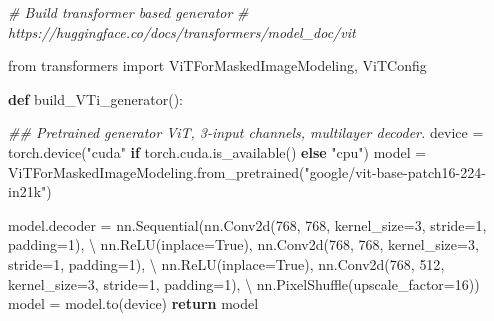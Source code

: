\documentclass[
]{article}
\newenvironment{Shaded}{}{}
\newcommand{\CommentTok}[1]{\textcolor[rgb]{0.38,0.63,0.69}{\textit{#1}}}
\newcommand{\ControlFlowTok}[1]{\textcolor[rgb]{0.00,0.44,0.13}{\textbf{#1}}}
\newcommand{\DecValTok}[1]{\textcolor[rgb]{0.25,0.63,0.44}{#1}}
\newcommand{\ImportTok}[1]{#1}
\newcommand{\KeywordTok}[1]{\textcolor[rgb]{0.00,0.44,0.13}{\textbf{#1}}}
\newcommand{\NormalTok}[1]{#1}
\newcommand{\OperatorTok}[1]{\textcolor[rgb]{0.40,0.40,0.40}{#1}}
\newcommand{\StringTok}[1]{\textcolor[rgb]{0.25,0.44,0.63}{#1}}
\newcommand{\VariableTok}[1]{\textcolor[rgb]{0.10,0.09,0.49}{#1}}
\begin{document}
\begin{Shaded}
\begin{Highlighting}[]
\CommentTok{\# Build transformer based generator}
\CommentTok{\# https://huggingface.co/docs/transformers/model\_doc/vit}

\ImportTok{from}\NormalTok{ transformers }\ImportTok{import}\NormalTok{ ViTForMaskedImageModeling, ViTConfig}


\KeywordTok{def}\NormalTok{ build\_VTi\_generator():}

    \CommentTok{\#\# Pretrained generator ViT, 3{-}input channels, multilayer decoder.}
\NormalTok{    device }\OperatorTok{=}\NormalTok{ torch.device(}\StringTok{"cuda"} \ControlFlowTok{if}\NormalTok{ torch.cuda.is\_available() }\ControlFlowTok{else} \StringTok{"cpu"}\NormalTok{)}
\NormalTok{    model }\OperatorTok{=}\NormalTok{ ViTForMaskedImageModeling.from\_pretrained(}\StringTok{"google/vit{-}base{-}patch16{-}224{-}in21k"}\NormalTok{)}

\NormalTok{    model.decoder }\OperatorTok{=}\NormalTok{ nn.Sequential(nn.Conv2d(}\DecValTok{768}\NormalTok{, }\DecValTok{768}\NormalTok{, kernel\_size}\OperatorTok{=}\DecValTok{3}\NormalTok{, stride}\OperatorTok{=}\DecValTok{1}\NormalTok{, padding}\OperatorTok{=}\DecValTok{1}\NormalTok{), }\OperatorTok{\textbackslash{}}
\NormalTok{                                    nn.ReLU(inplace}\OperatorTok{=}\VariableTok{True}\NormalTok{),}
\NormalTok{                                    nn.Conv2d(}\DecValTok{768}\NormalTok{, }\DecValTok{768}\NormalTok{, kernel\_size}\OperatorTok{=}\DecValTok{3}\NormalTok{, stride}\OperatorTok{=}\DecValTok{1}\NormalTok{, padding}\OperatorTok{=}\DecValTok{1}\NormalTok{), }\OperatorTok{\textbackslash{}}
\NormalTok{                                    nn.ReLU(inplace}\OperatorTok{=}\VariableTok{True}\NormalTok{),}
\NormalTok{                                    nn.Conv2d(}\DecValTok{768}\NormalTok{, }\DecValTok{512}\NormalTok{, kernel\_size}\OperatorTok{=}\DecValTok{3}\NormalTok{, stride}\OperatorTok{=}\DecValTok{1}\NormalTok{, padding}\OperatorTok{=}\DecValTok{1}\NormalTok{), }\OperatorTok{\textbackslash{}}
\NormalTok{                                    nn.PixelShuffle(upscale\_factor}\OperatorTok{=}\DecValTok{16}\NormalTok{))}
\NormalTok{    model }\OperatorTok{=}\NormalTok{ model.to(device)}
    \ControlFlowTok{return}\NormalTok{ model}
\end{Highlighting}
\end{Shaded}
\end{document}
